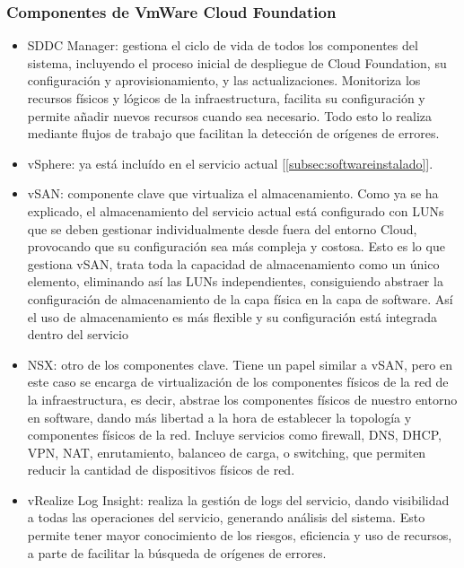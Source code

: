 \subsubsection{Componentes de VmWare Cloud Foundation \cite{componentesCloudFound}}

\begin{itemize}
    \item SDDC Manager: gestiona el ciclo de vida de todos los componentes del sistema, incluyendo el proceso inicial de despliegue de Cloud Foundation, su configuración y aprovisionamiento, y las actualizaciones. Monitoriza los recursos físicos y lógicos de la infraestructura, facilita su configuración y permite añadir nuevos recursos cuando sea necesario. Todo esto lo realiza mediante flujos de trabajo que facilitan la detección de orígenes de errores.
    \item vSphere: ya está incluído en el servicio actual [\ref{subsec:softwareinstalado}].
    \item vSAN: componente clave que virtualiza el almacenamiento. Como ya se ha explicado, el almacenamiento del servicio actual está configurado con LUNs que se deben gestionar individualmente desde fuera del entorno Cloud, provocando que su configuración sea más compleja y costosa. Esto es lo que gestiona vSAN, trata toda la capacidad de almacenamiento como un único elemento, eliminando así las LUNs independientes, consiguiendo abstraer la configuración de almacenamiento de la capa física en la capa de software. Así el uso de almacenamiento es más flexible y su configuración está integrada dentro del servicio
    \item NSX: otro de los componentes clave. Tiene un papel similar a vSAN, pero en este caso se encarga de virtualización de los componentes físicos de la red de la infraestructura, es decir, abstrae los componentes físicos de nuestro entorno en software, dando más libertad a la hora de establecer la topología y componentes físicos de la red. Incluye servicios como firewall, DNS, DHCP, VPN, NAT, enrutamiento, balanceo de carga, o switching, que permiten reducir la cantidad de dispositivos físicos de red.
    \item vRealize Log Insight: realiza la gestión de logs del servicio, dando visibilidad a todas las operaciones del servicio, generando análisis del sistema. Esto permite tener mayor conocimiento de los riesgos, eficiencia y uso de recursos, a parte de facilitar la búsqueda de orígenes de errores.
\end{itemize}

